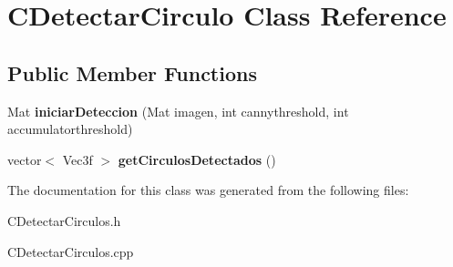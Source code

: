 \hypertarget{classCDetectarCirculo}{}\section{C\+Detectar\+Circulo Class Reference}
\label{classCDetectarCirculo}
\subsection*{Public Member Functions}
\begin{DoxyCompactItemize}
\item 
Mat {\bfseries iniciar\+Deteccion} (Mat imagen, int cannythreshold, int accumulatorthreshold)\hypertarget{classCDetectarCirculo_a649c9f3888f669032bd3811c902d0ef9}{}\label{classCDetectarCirculo_a649c9f3888f669032bd3811c902d0ef9}

\item 
vector$<$ Vec3f $>$ {\bfseries get\+Circulos\+Detectados} ()\hypertarget{classCDetectarCirculo_a6521238e2bf5be28294aa480ad0933ba}{}\label{classCDetectarCirculo_a6521238e2bf5be28294aa480ad0933ba}

\end{DoxyCompactItemize}


The documentation for this class was generated from the following files\+:\begin{DoxyCompactItemize}
\item 
C\+Detectar\+Circulos.\+h\item 
C\+Detectar\+Circulos.\+cpp\end{DoxyCompactItemize}
